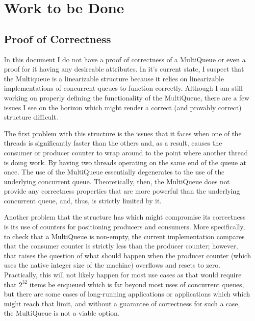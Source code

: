 \documentclass[12pt]{report}
\begin{document}
\begin{scriptsize}
\begin{algorithm}[H]
{}
\end{algorithm}
\end{scriptsize}

\section{Work to be Done}
\subsection{Proof of Correctness}
In this document I do not have a proof of correctness of a MultiQueue or even a
proof for it having any desireable attributes. In it's current state, I suspect
that the Multiqueue is a linearizable structure because it relies on
linearizable implementations of concurrent queues to function correctly.
Although I am still working on properly defining the functionality of the
MultiQueue, there are a few issues I see on the horizon which might render a
correct (and provably correct) structure difficult.

The first problem with this structure is the issues that it faces when one of
the threads is significantly faster than the others and, as a result, causes
the consumer or producer counter to wrap around to the point where another
thread is doing work. By having two threads operating on the same end of the
queue at once. The use of the MultiQueue essentially degenerates to the use of
the underlying concurrent queue. Theoretically, then, the MultiQueue does not
provide any correctness properties that are more powerful than the underlying
concurrent queue, and, thus, is strictly limited by it.

Another problem that the structure has which might compromise its correctness
is its use of counters for positioning producers and consumers. More
specifically, to check that a MultiQueue is non-empty, the current
implementation compares that the consumer counter is strictly less than the
producer counter; however, that raises the question of what should happen when
the producer counter (which uses the native integer size of the machine)
overflows and resets to zero. Practically, this will not likely happen for most
use cases as that would require that $2^{32}$ items be enqueued which is far
beyond most uses of concurrent queues, but there are some cases of long-running
applications or applications which which might reach that limit, and without a
guarantee of correctness for such a case, the MultiQueue is not a viable
option.
\end{document}
